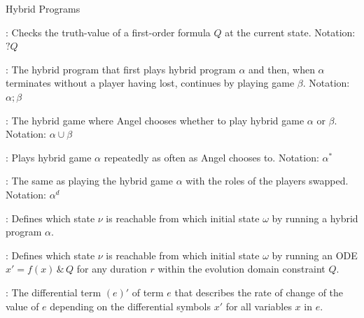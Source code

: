 \documentclass[hidelinks]{article}
\begin{document}
\begin{smodule}[title={Hybrid Systems}]{Hybrid Programs}
    \begin{sdefinition}[for=Test]
        : Checks the truth-value of a first-order formula $Q$ at the current state. Notation: $?Q$
    \end{sdefinition}

    \begin{sdefinition}[for=SequentialComposition]
        : The hybrid program that first plays hybrid program $\alpha$ and then, when $\alpha$ terminates without a player having lost, continues by playing game $\beta$. Notation: $\alpha;\beta$
    \end{sdefinition}

    \begin{sdefinition}[for=Choice]
        : The hybrid game where Angel chooses whether to play hybrid game $\alpha$ or $\beta$. Notation: $\alpha \cup \beta$
    \end{sdefinition}

    \begin{sdefinition}[for=Repeat]
        : Plays hybrid game $\alpha$ repeatedly as often as Angel chooses to. Notation: $\alpha^*$
    \end{sdefinition}

    \begin{sdefinition}[for=Dual]
        :  The same as playing the hybrid game $\alpha$ with the roles of the players swapped. Notation: $\alpha^d$
    \end{sdefinition}

    \begin{sdefinition}[for=TransitionSemantics]
        : Defines which state $\nu$ is reachable from which initial state $\omega$ by running a hybrid program $\alpha$.
    \end{sdefinition}

    \begin{sdefinition}[for=ODESemantics]
        : Defines which state $\nu$ is reachable from which initial state $\omega$ by running an ODE $x' = f(x) \, \& \, Q$ for any duration $r$ within the evolution domain constraint $Q$.
    \end{sdefinition}

    \begin{sdefinition}[for=DifferentialTerm]
        : The differential term $(e)'$ of term $e$ that describes the rate of change of the value of $e$ depending on the differential symbols $x'$ for all variables $x$ in $e$.
    \end{sdefinition}


\end{smodule}
\end{document}
